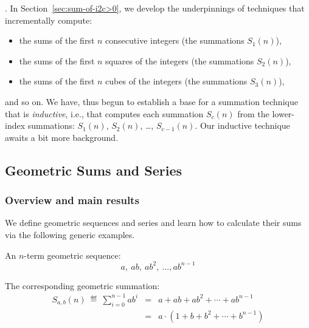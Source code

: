 \bigskip

.
In Section~\ref{sec:sum-of-i2c>0}, we develop the underpinnings of
techniques that incrementally compute:
\begin{itemize}
\item
the sums of the first $n$ consecutive integers (the summations $S_1(n)$), 
\item
the sums of the first $n$ squares of the integers (the summations $S_2(n)$), 
\item
the sums of the first $n$ cubes of the integers (the summations $S_3(n)$),
\end{itemize}
and so on.  We have, thus begun to establish a base for a summation technique that is {\em inductive}, i.e., that computes each summation $S_c(n)$ from the lower-index summations: $S_1(n)$, $S_2(n)$, \ldots, $S_{c-1}(n)$.  Our inductive technique awaits a bit more background.


\subsection{Geometric Sums and Series}
\label{sec:general-geometric-series}
\label{sec:geometric-sums}
\label{sec:general-geometric-sums}

\subsubsection{Overview and main results}

We define geometric sequences and series and learn how to calculate their sums via the following generic examples.

\medskip

An $n$-term geometric sequence:
\begin{equation}
\label{eq:genl-geom-seq}
a, \ ab, \ ab^2, \ \ldots, ab^{n-1}
\end{equation}

The corresponding geometric summation:
\begin{eqnarray}
\label{eq:genl-geom-summation}
S_{a,b}(n)
 \ \eqdef \  \sum_{i=0}^{n-1} a b^i 
 & = &  a + ab + ab^2 + \cdots + ab^{n-1} \\
\nonumber
 & = & 
 a \cdot (1+ b + b^2 + \cdots + b^{n-1})
\end{eqnarray}

